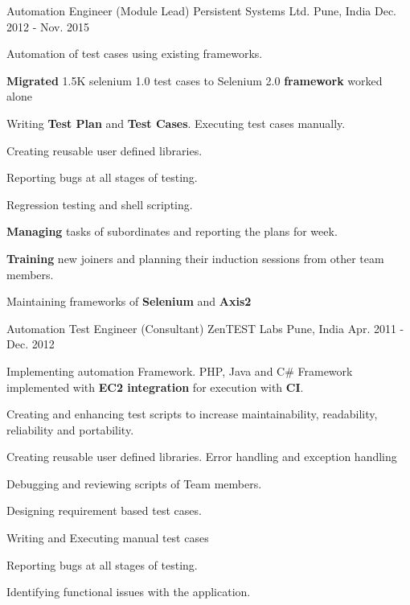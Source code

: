 \begin{cventries}
  \cventry
    {Automation Engineer (Module Lead)} %
    {Persistent Systems Ltd.} %
    {Pune, India} %
    {Dec. 2012 - Nov. 2015} %
    {
      \begin{cvitems} %
      \item {Automation of test cases using existing frameworks.}
	  \item {\textbf{Migrated} 1.5K selenium 1.0 test cases to Selenium 2.0 \textbf{framework} worked alone}
      \item {Writing \textbf{Test Plan} and \textbf{Test Cases}. Executing test cases manually.}
       \item {Creating reusable user defined libraries.}
      \item {Reporting bugs at all stages of testing.}
     \item {Regression testing and shell scripting.}
     \item {\textbf{Managing} tasks of subordinates and reporting the plans for week.}
     \item {\textbf{Training} new joiners and planning their induction sessions from other team members.}
   \item {Maintaining frameworks of \textbf{Selenium} and \textbf{Axis2}}
      \end{cvitems}
    }

  \cventry
    {Automation Test Engineer (Consultant)} %
    {ZenTEST Labs} %
    {Pune, India} %
    {Apr. 2011 - Dec. 2012} %
    {
      \begin{cvitems} %
        \item {Implementing automation Framework. PHP, Java and C\# Framework implemented with \textbf{EC2 integration} for execution with \textbf{CI}.}
        \item {Creating and enhancing test scripts to increase maintainability, readability, reliability and portability.}
        \item {Creating reusable user defined libraries. Error handling and exception handling}
        \item {Debugging and reviewing scripts of Team members.}
        \item {Designing requirement based test cases.}
       \item {Writing and Executing manual test cases}
       \item {Reporting bugs at all stages of testing.}
      \item {Identifying functional issues with the application.}
      \end{cvitems}
    }


\end{cventries}
